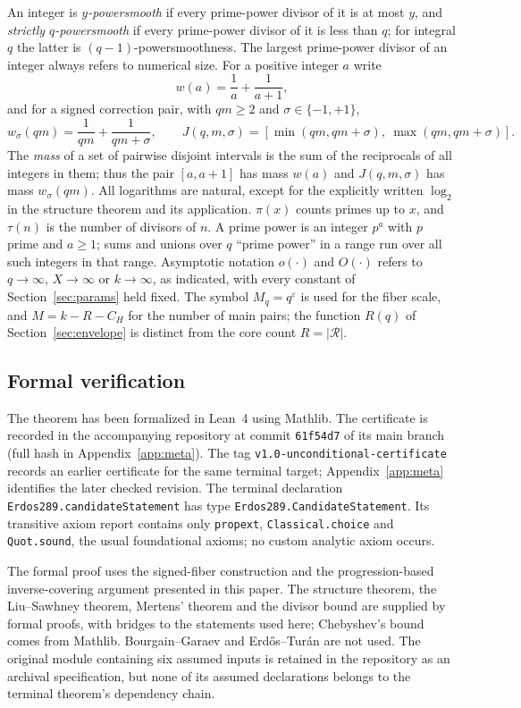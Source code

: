 \documentclass[11pt,letterpaper]{article}
\numberwithin{equation}{section}
\theoremstyle{plain}
\theoremstyle{remark}
\newcommand{\cR}{\mathcal R}
\begin{document}
An integer is \emph{$y$-powersmooth} if every prime-power divisor of it is at most $y$, and \emph{strictly $q$-powersmooth} if every prime-power divisor of it is less than $q$; for integral $q$ the latter is $(q-1)$-powersmoothness. The largest prime-power divisor of an integer always refers to numerical size. For a positive integer $a$ write
\[
w(a)=\frac1a+\frac1{a+1},
\]
and for a signed correction pair, with $qm\ge2$ and $\sigma\in\{-1,+1\}$,
\[
w_\sigma(qm)=\frac1{qm}+\frac1{qm+\sigma},\qquad
J(q,m,\sigma)=[\min(qm,qm+\sigma),\ \max(qm,qm+\sigma)].
\]
The \emph{mass} of a set of pairwise disjoint intervals is the sum of the reciprocals of all integers in them; thus the pair $[a,a+1]$ has mass $w(a)$ and $J(q,m,\sigma)$ has mass $w_\sigma(qm)$. All logarithms are natural, except for the explicitly written $\log_2$ in the structure theorem and its application. $\pi(x)$ counts primes up to $x$, and $\tau(n)$ is the number of divisors of $n$. A prime power is an integer $p^a$ with $p$ prime and $a\ge1$; sums and unions over $q$ ``prime power'' in a range run over all such integers in that range. Asymptotic notation $o(\cdot)$ and $O(\cdot)$ refers to $q\to\infty$, $X\to\infty$ or $k\to\infty$, as indicated, with every constant of Section~\ref{sec:params} held fixed. The symbol $M_q=q^\varepsilon$ is used for the fiber scale, and $M=k-R-C_H$ for the number of main pairs; the function $R(q)$ of Section~\ref{sec:envelope} is distinct from the core count $R=|\cR|$.

\subsection{Formal verification}\label{sec:formal}

The theorem has been formalized in Lean~4 using Mathlib. The certificate is recorded in the accompanying repository \cite{Repo} at commit \texttt{61f54d7} of its main branch (full hash in Appendix~\ref{app:meta}). The tag \texttt{v1.0-unconditional-certificate} records an earlier certificate for the same terminal target; Appendix~\ref{app:meta} identifies the later checked revision. The terminal declaration \texttt{Erdos289.candidateStatement} has type \texttt{Erdos289.CandidateStatement}. Its transitive axiom report contains only \texttt{propext}, \texttt{Classical.choice} and \texttt{Quot.sound}, the usual foundational axioms; no custom analytic axiom occurs.

The formal proof uses the signed-fiber construction and the progression-based inverse-covering argument presented in this paper. The structure theorem, the Liu--Sawhney theorem, Mertens' theorem and the divisor bound are supplied by formal proofs, with bridges to the statements used here; Chebyshev's bound comes from Mathlib. Bourgain--Garaev and Erd\H{o}s--Tur\'an are not used. The original module containing six assumed inputs is retained in the repository as an archival specification, but none of its assumed declarations belongs to the terminal theorem's dependency chain.
\end{document}
